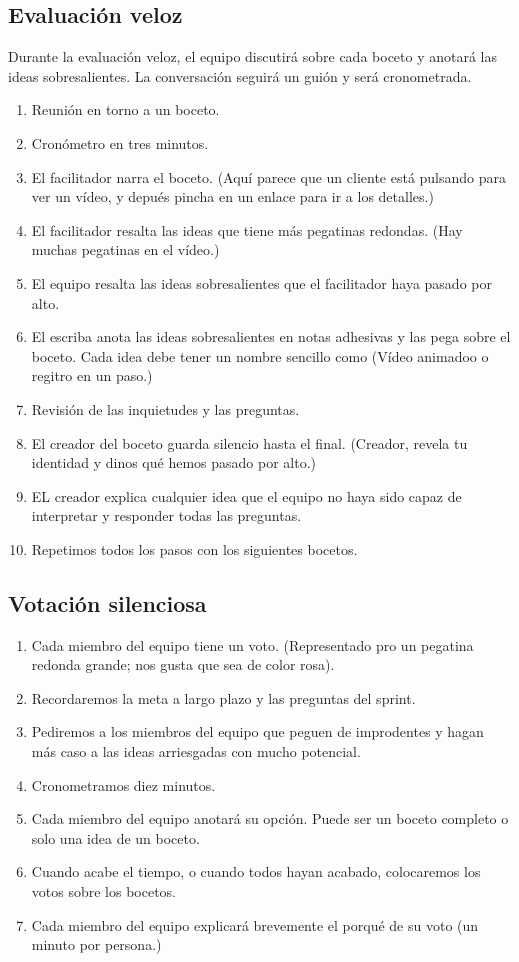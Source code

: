 \documentclass[10pt]{article}
\begin{document}
\begin{multicols}{2}
\subsection*{Evaluación veloz}
Durante la evaluación veloz, el equipo discutirá sobre cada boceto y anotará las ideas sobresalientes. La conversación seguirá un guión y será cronometrada.
\begin{enumerate}[\bfseries 1.]
\item Reunión en torno a un boceto.
\item Cronómetro en tres minutos.
\item El facilitador narra el boceto. (Aquí parece que un cliente está pulsando para ver un vídeo, y depués pincha en un enlace para ir a los detalles.)
\item El facilitador resalta las ideas que tiene más pegatinas redondas. (Hay muchas pegatinas en el vídeo.)
\item El equipo resalta las ideas sobresalientes que el facilitador haya pasado por alto.
\item El escriba anota las ideas sobresalientes en notas adhesivas y las pega sobre el boceto. Cada idea debe tener un nombre sencillo como (Vídeo animadoo o regitro en un paso.)
\item Revisión de las inquietudes y las preguntas.
\item El creador del boceto guarda silencio hasta el final. (Creador, revela tu identidad y dinos qué hemos pasado por alto.)
\item EL creador explica cualquier idea que el equipo no haya sido capaz de interpretar y responder todas las preguntas.
\item Repetimos todos los pasos con los siguientes bocetos. 
\end{enumerate}
\subsection*{Votación silenciosa}
\begin{enumerate}[\bfseries 1.]
\item Cada miembro del equipo tiene un voto. (Representado pro un pegatina redonda grande; nos gusta que sea de color rosa).
\item Recordaremos la meta a largo plazo y las preguntas del sprint.
\item Pediremos a los miembros del equipo que peguen de improdentes y hagan más caso a las ideas arriesgadas con mucho potencial.
\item Cronometramos diez minutos.
\item Cada miembro del equipo anotará su opción. Puede ser un boceto completo o solo una idea de un boceto.
\item Cuando acabe el tiempo, o cuando todos hayan acabado, colocaremos los votos sobre los bocetos.
\item Cada miembro del equipo explicará brevemente el porqué de su voto (un minuto por persona.)
\end{enumerate}

\end{multicols}
\end{document}

